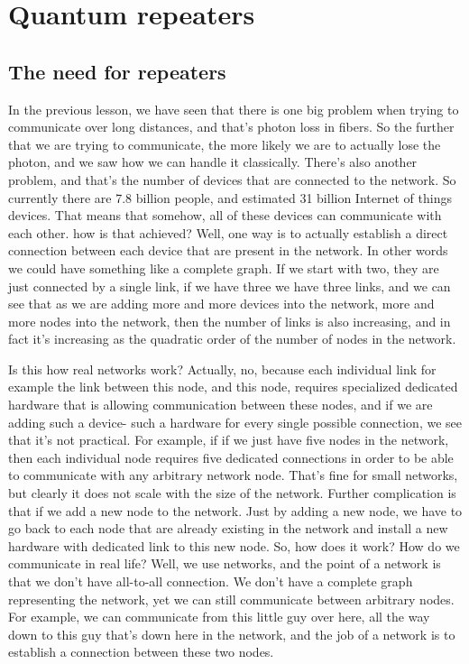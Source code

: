 \chapter{Quantum repeaters}

\section{The need for repeaters}



In the previous lesson, we have seen that there is one big problem when trying to communicate over long distances, and that's photon loss in fibers. So the further that we are trying to communicate, the more likely we are to actually lose the photon, and we saw how we can handle it classically. There's also another problem, and that's the number of devices that are connected to the network. So currently there are 7.8 billion people, and estimated 31 billion Internet of things devices. That means that somehow, all of these devices can communicate with each other. how is that achieved? Well, one way is to actually establish a direct connection between each device that are present in the network. In other words we could have something like a complete graph. If we start with two, they are just connected by a single link, if we have three we have three links, and we can see that as we are adding more and more devices into the network, more and more nodes into the network, then the number of links is also increasing, and in fact it's increasing as the quadratic order of the number of nodes in the network.

Is this how real networks work? Actually, no, because each individual link for example the link between this node, and this node, requires specialized dedicated hardware that is allowing communication between these nodes, and if we are adding such a device- such a hardware for every single possible connection, we see that it's not practical. For example, if if we just have five nodes in the network, then each individual node requires five dedicated connections in order to be able to communicate with any arbitrary network node. That's fine for small networks, but clearly it does not scale with the size of the network. Further complication is that if we add a new node to the network. Just by adding a new node, we have to go back to each node that are already existing in the network and install a new hardware with dedicated link to this new node. So, how does it work? How do we communicate in real life? Well, we use networks, and the point of a network is that we don't have all-to-all connection. We don't have a complete graph representing the network, yet we can still communicate between arbitrary nodes. For example, we can communicate from this little guy over here, all the way down to this guy that's down here in the network, and the job of a network is to establish a connection between these two nodes.

